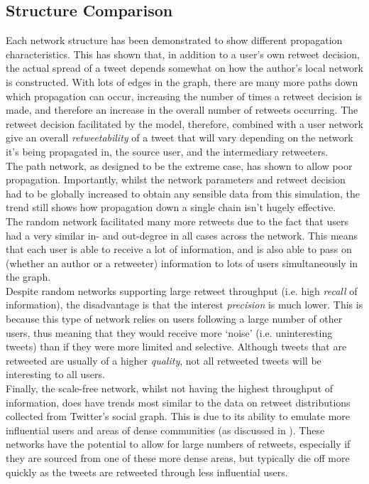 \subsection{Structure Comparison}
Each network structure has been demonstrated to show different propagation characteristics. This has shown that, in addition to a user's own retweet decision, the actual spread of a tweet depends somewhat on how the author's local network is constructed. With lots of edges in the graph, there are many more paths down which propagation can occur, increasing the number of times a retweet decision is made, and therefore an increase in the overall number of retweets occurring. The retweet decision facilitated by the model, therefore, combined with a user network give an overall \textit{retweetability} of a tweet that will vary depending on the network it's being propagated in, the source user, and the intermediary retweeters.
\\
The path network, as designed to be the extreme case, has shown to allow poor propagation. Importantly, whilst the network parameters and retweet decision had to be globally increased to obtain any sensible data from this simulation, the trend still shows how propagation down a single chain isn't hugely effective.
\\
The random network facilitated many more retweets due to the fact that users had a very similar in- and out-degree in all cases across the network. This means that each user is able to receive a lot of information, and is also able to pass on (whether an author or a retweeter) information to lots of users simultaneously in the graph. 
\\ 
Despite random networks supporting large retweet throughput (i.e. high \emph{recall} of information), the disadvantage is that the interest \emph{precision}  is much lower. This is because this type of network relies on users following a large number of other users, thus meaning that they would receive more `noise' (i.e. uninteresting tweets) than if they were more limited and selective. Although tweets that are retweeted are usually of a higher \emph{quality}, not all retweeted tweets will be interesting to all users.
\\
Finally, the scale-free network, whilst not having the highest throughput of information, does have trends most similar to the data on retweet distributions collected from Twitter's social graph. This is due to its ability to emulate more influential users and areas of dense communities (as discussed in \cite{java07}). These networks have the potential to allow for large numbers of retweets, especially if they are sourced from one of these more dense areas, but typically die off more quickly as the tweets are retweeted through less influential users.

